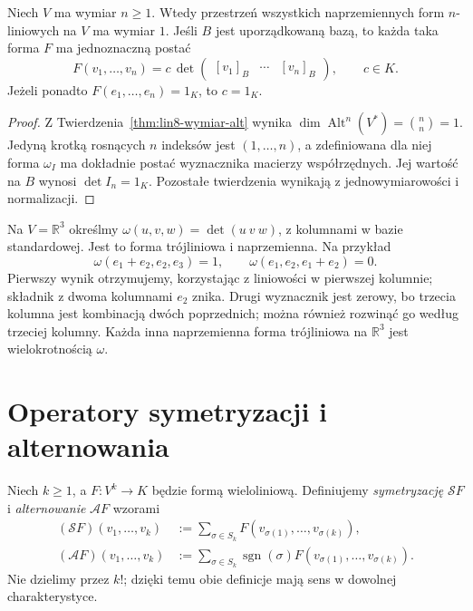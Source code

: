 \begin{wniosek}
\label{cor:lin8-wyznacznik-alt}
Niech \(V\) ma wymiar \(n\geq1\).
Wtedy przestrzeń wszystkich
naprzemiennych form \(n\)-liniowych
na \(V\) ma wymiar \(1\).
Jeśli \(B\) jest uporządkowaną bazą,
to każda taka forma \(F\)
ma jednoznaczną postać
\[
 F(v_1,\ldots,v_n)
 =c\,\det\begin{pmatrix}
 [v_1]_B&\cdots&[v_n]_B
 \end{pmatrix},
 \qquad c\in K.
\]
Jeżeli ponadto
\(F(e_1,\ldots,e_n)=1_K\),
to \(c=1_K\).
\end{wniosek}
\begin{proof}
Z
Twierdzenia~\ref{thm:lin8-wymiar-alt}
wynika
\(\dim\operatorname{Alt}^n(V^*)
=\binom{n}{n}=1\).
Jedyną krotką rosnących
\(n\) indeksów jest
\((1,\ldots,n)\), a zdefiniowana
dla niej forma \(\omega_I\)
ma dokładnie postać
wyznacznika macierzy współrzędnych.
Jej wartość na \(B\)
wynosi \(\det I_n=1_K\).
Pozostałe twierdzenia wynikają
z jednowymiarowości i normalizacji.
\end{proof}

\begin{przyklad}
\label{prz:lin8-alt-r3}
Na \(V=\mathbb R^3\) określmy
\(\omega(u,v,w)=\det(u\ v\ w)\),
z kolumnami w bazie standardowej.
Jest to forma trójliniowa i
naprzemienna. Na przykład
\[
 \omega(e_1+e_2,e_2,e_3)=1,
 \qquad
 \omega(e_1,e_2,e_1+e_2)=0.
\]
Pierwszy wynik otrzymujemy,
korzystając z liniowości
w pierwszej kolumnie;
składnik z dwoma kolumnami \(e_2\)
znika. Drugi wyznacznik jest zerowy,
bo trzecia kolumna jest kombinacją
dwóch poprzednich; można również
rozwinąć go według trzeciej kolumny.
Każda inna naprzemienna forma
trójliniowa na \(\mathbb R^3\)
jest wielokrotnością \(\omega\).
\end{przyklad}

\section{Operatory symetryzacji i alternowania}
\label{sec:lin8-operatory-sym-alt}

\begin{definicja}
\label{def:lin8-operatory}
Niech \(k\geq1\), a
\(F\colon V^k\to K\)
będzie formą wieloliniową.
Definiujemy \emph{symetryzację}
\(\mathcal S F\) i
\emph{alternowanie}
\(\mathcal A F\) wzorami
\[
 \begin{aligned}
 (\mathcal SF)(v_1,\ldots,v_k)
 &:=\sum_{\sigma\in S_k}
    F(v_{\sigma(1)},\ldots,v_{\sigma(k)}),\\
 (\mathcal AF)(v_1,\ldots,v_k)
 &:=\sum_{\sigma\in S_k}
    \operatorname{sgn}(\sigma)
    F(v_{\sigma(1)},\ldots,v_{\sigma(k)}).
 \end{aligned}
\]
Nie dzielimy przez \(k!\);
dzięki temu obie definicje
mają sens w dowolnej charakterystyce.
\end{definicja}

